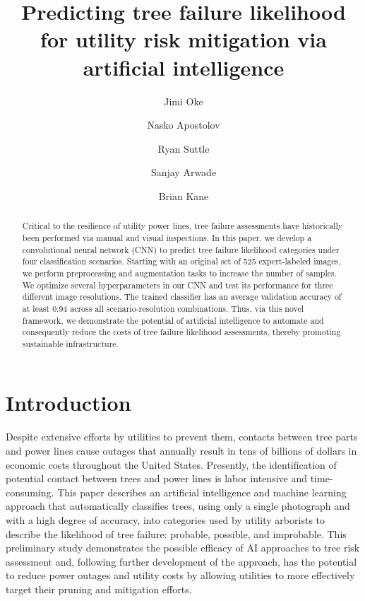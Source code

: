 \documentclass[Journal,letterpaper, SingleSpace, InsideFigs]{ascelike-new}
\begin{document}
\title{Predicting tree failure likelihood for utility risk mitigation via artificial intelligence}
\author[1]{Jimi Oke}
\author[1]{Nasko Apostolov}
\author[2]{Ryan Suttle}
\author[1]{Sanjay Arwade}
\author[2]{Brian Kane}


\maketitle

\begin{abstract}
  Critical to the resilience of utility power lines, tree failure assessments have historically been performed via
  manual and visual inspections.  In this paper, we develop a convolutional neural network (CNN) to predict tree failure
  likelihood categories under four classification scenarios.  Starting with an original set of 525 expert-labeled images, we perform
  preprocessing and augmentation tasks to increase the number of samples. We optimize several hyperparameters in our CNN
  and test its performance for three different image resolutions. The trained classifier has an average validation
  accuracy of at least 0.94 across all scenario-resolution combinations.  Thus, via this novel framework, we
  demonstrate the potential of artificial intelligence to automate and consequently reduce the costs of tree failure
  likelihood assessments, thereby promoting sustainable infrastructure.
\end{abstract}

\section{Introduction}
Despite extensive efforts by utilities to prevent them, contacts between tree parts and power lines cause outages that annually result in tens of billions of dollars in economic costs throughout the United States.  Presently, the identification of potential contact between trees and power lines is labor intensive and time-consuming.  This paper describes an artificial intelligence and machine learning approach that automatically classifies trees, using only a single photograph and with a high degree of accuracy, into categories used by utility arborists to describe the likelihood of tree failure: probable, possible, and improbable.  This preliminary study demonstrates the possible efficacy of AI approaches to tree risk assessment and, following further development of the approach, has the potential to reduce power outages and utility costs by allowing utilities to more effectively target their pruning and mitigation efforts.  
\end{document}
